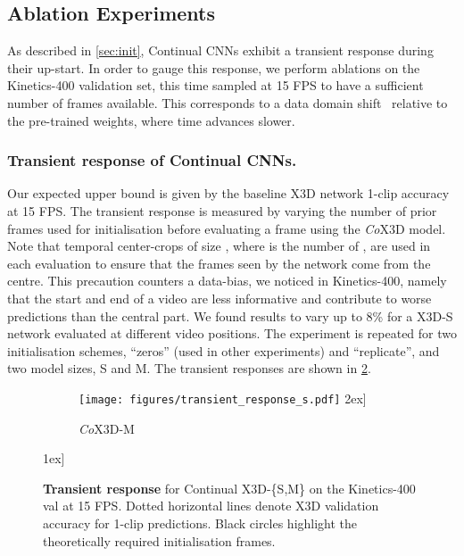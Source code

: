 \documentclass[runningheads]{llncs}
\begin{document}
\renewcommand*{\thefootnote}{\arabic{footnote}}

\vspace{-3mm}
\subsection{Ablation Experiments}
\vspace{-1mm}
As described in \cref{sec:init}, Continual CNNs exhibit a transient response during their up-start.
In order to gauge this response, we perform ablations on the Kinetics-400 validation set, this time sampled at 15 FPS to have a sufficient number of frames available.
This corresponds to a data domain shift~\cite{wang2018deep} relative to the pre-trained weights, where time advances slower.

\vspace{-3mm}
\subsubsection{Transient response of Continual CNNs.} \label{sec:exp-transient}
Our expected upper bound is given by the baseline X3D network 1-clip accuracy at 15 FPS.
The transient response is measured by varying the number of prior frames used for initialisation before evaluating a frame using the \textit{Co}X3D model.
Note that temporal center-crops of size , where  is the number of , are used in each evaluation to ensure that the frames seen by the network come from the centre. 
This precaution counters a data-bias, we noticed in Kinetics-400, namely that the start and end of a video are less informative and contribute to worse predictions than the central part. 
We found results to vary up to 8\% for a X3D-S network evaluated at different video positions.
The experiment is repeated for two initialisation schemes, ``zeros'' (used in other experiments) and ``replicate'', and two model sizes, S and M.
The transient responses are shown in \cref{fig:transient_response_results}.

\begin{figure}[b!]
\centering
\begin{subfigure}[b]{0.7\linewidth}
        \centering
        \texttt{[image: figures/transient\_response\_s.pdf]}
        \-2ex]
        \caption{\textit{Co}X3D-M}
        \label{fig:transient-m}
    \end{subfigure}
    \-1ex]
    \setlength{\belowcaptionskip}{-5pt}
	\caption{
	\textbf{Transient response} for Continual X3D-\{S,M\} on the Kinetics-400 val at 15 FPS.
	Dotted horizontal lines denote X3D validation accuracy for 1-clip predictions. 
	Black circles highlight the theoretically required initialisation frames.
	}
    \label{fig:transient_response_results}
    \vspace{-2mm}
\end{figure}
\end{document}
